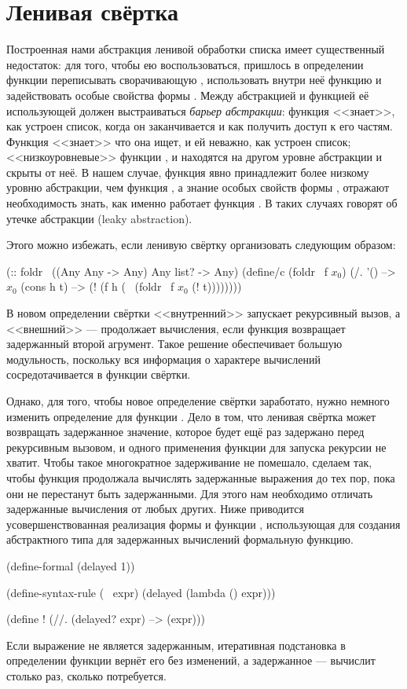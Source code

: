 \section[2]{Ленивая свёртка}%
Построенная нами абстракция ленивой обработки списка имеет существенный недостаток:
для того, чтобы ею воспользоваться, пришлось в определении функции  переписывать сворачивающую , использовать внутри неё функцию \s{!} и задействовать особые свойства формы . Между абстракцией и функцией её использующей должен выстраиваться \emph{барьер абстракции}: функция  <<знает>>, как устроен список, когда он заканчивается и как получить доступ к его частям. Функция  <<знает>> что она ищет, и ей неважно, как устроен список; <<низкоуровневые>> функции ,  и  находятся на другом уровне абстракции и скрыты от неё. В нашем случае, функция \s{!} явно принадлежит более низкому уровню абстракции, чем функция , а знание особых свойств формы , отражают необходимость знать, как именно работает функция . В таких случаях говорят об утечке абстракции (leaky abstraction).

Этого можно избежать, если ленивую свёртку организовать следующим образом:

\label{lazy-fold}
\begin{Definition}[emph={f,lst,h,t}]
(:: foldr~ ((Any Any -> Any) Any list? -> Any)
  (define/c (foldr~ f $x_0$)
    (/. '() --> $x_0$
        (cons h t) --> (! (f h (~ (foldr~ f $x_0$ (! t))))))))
\end{Definition}

\noindent
В новом определении свёртки <<внутренний>> \s{!} запускает рекурсивный вызов, а <<внешний>> --- продолжает вычисления, если функция  возвращает задержанный второй агрумент. Такое решение обеспечивает большую модульность, поскольку вся информация о характере вычислений сосредотачивается в функции свёртки.

Однако, для того, чтобы новое определение свёртки заработато, нужно немного изменить определение для функции \s{!}. Дело в том, что ленивая свёртка может возвращать задержанное значение, которое будет ещё раз задержано перед рекурсивным вызовом, и одного применения функции \s{!} для запуска рекурсии не хватит. Чтобы такое многократное задерживание не помешало, сделаем так, чтобы функция \s{!} продолжала вычислять задержанные выражения до тех пор, пока они не перестанут быть задержанными. Для этого нам необходимо отличать задержанные вычисления от любых других. Ниже приводится усовершенствованная реализация формы \s{~} и функции \s{!}, использующая для создания  
абстрактного типа для задержанных вычислений формальную функцию.
\begin{Definition}
(define-formal (delayed 1))

(define-syntax-rule (~ expr)
  (delayed (lambda () expr)))

(define !
  (//. (delayed? expr) --> (expr)))
\end{Definition}
\noindent
Если выражение не является задержанным, итеративная подстановка в определении функции \s{!} вернёт его без изменений, а задержанное --- вычислит столько раз, сколько потребуется.

